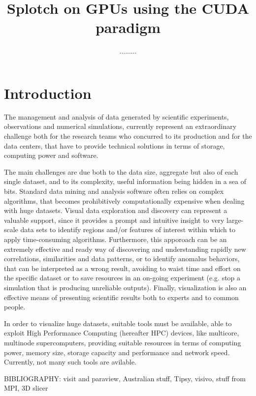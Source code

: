 \documentclass[11pt]{article}
\title{Splotch on GPUs using the CUDA paradigm}
\author{.........}
\begin{document}
\maketitle

\section{Introduction}

The management and analysis of data generated by scientific experiments, 
observations and numerical simulations, currently represent an extraordinary challenge  
both for the research teams who concurred to its production and for 
the data centers, that have to provide technical solutions in terms of 
storage, computing power and software.

The main challenges are due both to the data size, aggregate but also of each 
single dataset, and to its complexity, useful information being hidden in a sea 
of bits. Standard data mining and analysis software often relies on complex
algorithms, that becomes prohibitively computationally expensive when dealing with 
huge datasets. Visual data exploration and discovery can represent a valuable
support, since it provides a prompt and intuitive insight to
very large-scale data sets to identify regions and/or features of interest within which
to apply time-consuming algorithms. 
Furthermore, this apporoach can be an extremely effective and ready way of discovering 
and understanding rapidly new correlations,
similarities and data patterns, or to identify anomalus behaviors, that can be
interpreted as a wrong result, avoiding to waist time and effort on the specific dataset or
to save resources in an on-going experiment (e.g. stop a simulation that is producing 
unreliable outputs). Finally, visualization is also an effective means of presenting
scientific results both to experts and to common people.

In order to visualize huge datasets, suitable tools must be available, able to 
exploit High Performance Computing (hereafter HPC) devices, like multicore, multinode
supercomputers, providing suitable resources in terms of computing power, memory size, 
storage capacity and performance and network speed. Currently, not many such tools are avilable.

BIBLIOGRAPHY: visit and paraview, Australian stuff, Tipsy, visivo, stuff from MPI, 3D slicer
\end{document}
